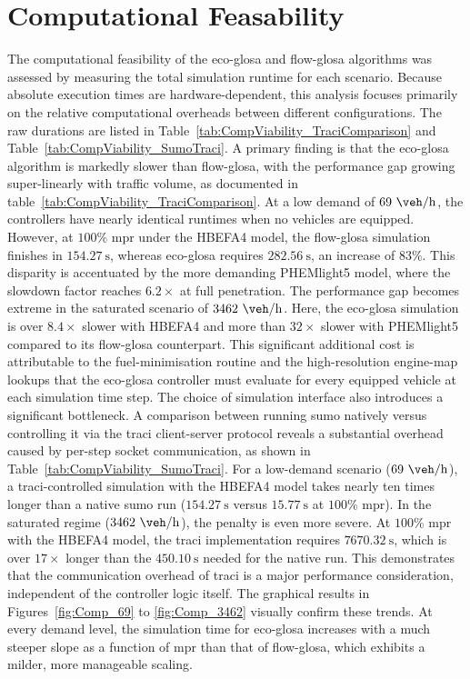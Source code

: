 \section{Computational Feasability}
\label{sec:Results_Computational}

The computational feasibility of the \ac{eco-glosa} and \ac{flow-glosa} algorithms was assessed by measuring the total simulation runtime for each scenario. Because absolute execution times are hardware-dependent, this analysis focuses primarily on the relative computational overheads between different configurations. The raw durations are listed in Table~\vref{tab:CompViability_TraciComparison} and Table~\vref{tab:CompViability_SumoTraci}.
\mynewline
A primary finding is that the \ac{eco-glosa} algorithm is markedly slower than \ac{flow-glosa}, with the performance gap growing super-linearly with traffic volume, as documented in table~\vref{tab:CompViability_TraciComparison}. At a low demand of $69~\unit{\veh\per\hour}$, the controllers have nearly identical runtimes when no vehicles are equipped. However, at $100\%$ \ac{mpr} under the HBEFA4 model, the \ac{flow-glosa} simulation finishes in $154.27~\unit{\second}$, whereas \ac{eco-glosa} requires $282.56~\unit{\second}$, an increase of $83\%$. This disparity is accentuated by the more demanding PHEMlight5 model, where the slowdown factor reaches $6.2\times$ at full penetration. The performance gap becomes extreme in the saturated scenario of $3462~\unit{\veh\per\hour}$. Here, the \ac{eco-glosa} simulation is over $8.4\times$ slower with HBEFA4 and more than $32\times$ slower with PHEMlight5 compared to its \ac{flow-glosa} counterpart. This significant additional cost is attributable to the fuel-minimisation routine and the high-resolution engine-map lookups that the \ac{eco-glosa} controller must evaluate for every equipped vehicle at each simulation time step.
\mynewline
The choice of simulation interface also introduces a significant bottleneck. A comparison between running \ac{sumo} natively versus controlling it via the \ac{traci} client-server protocol reveals a substantial overhead caused by per-step socket communication, as shown in Table~\vref{tab:CompViability_SumoTraci}. For a low-demand scenario ($69~\unit{\veh\per\hour}$), a \ac{traci}-controlled simulation with the HBEFA4 model takes nearly ten times longer than a native \ac{sumo} run ($154.27~\unit{\second}$ versus $15.77~\unit{\second}$ at $100\%$ \ac{mpr}). In the saturated regime ($3462~\unit{\veh\per\hour}$), the penalty is even more severe. At $100\%$ \ac{mpr} with the HBEFA4 model, the \ac{traci} implementation requires $7670.32~\unit{\second}$, which is over $17\times$ longer than the $450.10~\unit{\second}$ needed for the native run. This demonstrates that the communication overhead of \ac{traci} is a major performance consideration, independent of the controller logic itself.
\mynewline
The graphical results in Figures~\vref{fig:Comp_69} to \vref{fig:Comp_3462} visually confirm these trends. At every demand level, the simulation time for \ac{eco-glosa} increases with a much steeper slope as a function of \ac{mpr} than that of \ac{flow-glosa}, which exhibits a milder, more manageable scaling.


